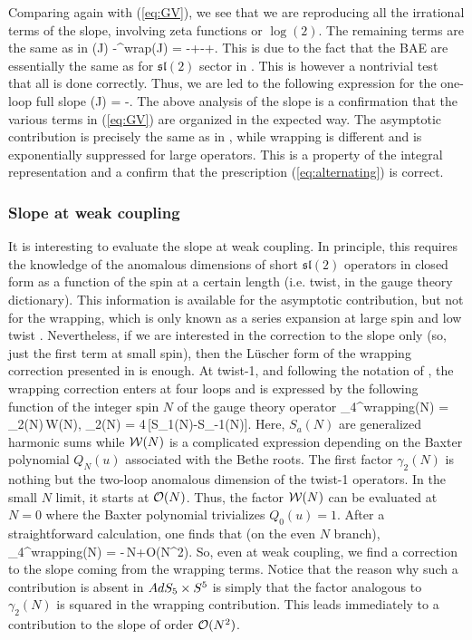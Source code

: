 \ea
Comparing again with (\ref{eq:GV}), we see that we are reproducing all the irrational terms of the slope, involving zeta functions or $\log(2)$. The remaining terms 
are the same as in \ads
\beq
\sigma(\mc J) -\sigma^{\rm wrap}(\mc J) = -+-+\cdots.
\eeq
This is due to the fact that the BAE are essentially the same as for $\mathfrak{sl}(2)$ sector in \ads. 
This is however a nontrivial test that all is done correctly.
Thus, we are led to the following expression for the one-loop full slope 
\beq
\sigma(\mc J) = -\left[\frac{1}{\mc J^{2}+1}+\sum_{n=-\infty}^{\infty}\frac{(-1)^{n}}{
\sqrt{\mc J^{4}+(n^{2}+1)\,\mc J^{2}+n^{2}}}
\right].
\eeq
The above analysis of the slope is a confirmation  that the various terms in (\ref{eq:GV}) are organized in the expected way. The asymptotic contribution is precisely the same as in \ads, while wrapping is different and is exponentially
suppressed for large operators. This is a property of the integral representation and a confirm that the 
prescription (\ref{eq:alternating}) is correct.

\subsubsection{Slope at weak coupling}

It is interesting to evaluate the slope at weak coupling.
 In principle, this  requires the knowledge of the anomalous dimensions of 
short $\mathfrak{sl}(2)$ operators in closed form as a function of the spin at a certain length (i.e. twist, in the gauge theory
dictionary). This information is 
available for the asymptotic contribution, but not for the wrapping, which is only known as a series expansion 
at large spin and low twist \cite{Beccaria:2009ny,Beccaria:2010kd}.
 Nevertheless, if we are interested in the correction to the slope only (so, just the first term at small spin), then the L\"uscher form of the wrapping correction
presented in \cite{Beccaria:2009ny} is enough. 
At twist-1, and following the notation of \cite{Beccaria:2009ny}, the wrapping correction enters at four loops
and is expressed by the following function of the integer spin $N$ of the gauge theory operator
\beq
\gamma_{4}^{\rm wrapping}(N) = \gamma_{2}(N)\,\mc W(N),
\qquad \gamma_{2}(N) = 4\,[S_{1}(N)-S_{-1}(N)].
\eeq
Here, $S_{a}(N)$ are generalized harmonic sums while $\mathcal W(N)$ is a complicated expression depending on the 
Baxter polynomial $Q_{N}(u)$ associated with the Bethe roots. The first factor $\gamma_{2}(N)$ 
is nothing but the two-loop
anomalous dimension of the twist-1 operators. In the small $N$ limit, it starts at $\mathcal O(N)$. Thus, the 
factor $\mathcal W(N)$ can be evaluated at $N=0$ where the Baxter polynomial trivializes $Q_{0}(u)=1$.
After a straightforward calculation, one finds that (on the even $N$ branch),
\beq
\gamma_{4}^{\rm wrapping}(N) = -\,N+\mc O(N^{2}).
\eeq
So, even at weak coupling, we find a correction to the slope coming from the wrapping 
terms.
Notice that  the reason why such a contribution is absent in $AdS_5 \times S^5$ is simply that the factor analogous to $\gamma_{2}(N)$ is squared in the wrapping contribution. 
This leads immediately to a contribution to the slope of order $\mathcal O(N^{2})$.


